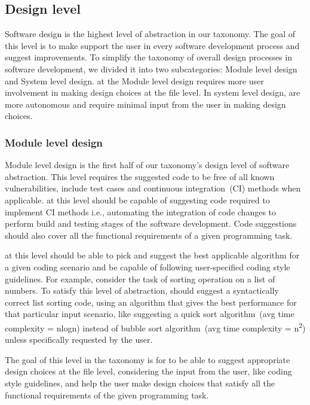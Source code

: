 \subsection{Design level}
Software design is the highest level of abstraction in our taxonomy. The goal of this level is to make \cct{} support the user in every software development process and suggest improvements.
To simplify the taxonomy of overall design processes in software development, we divided it into two subcategories: Module level design and System level design. 
\cct{} at the Module level design requires more user involvement in making design choices at the file level.
In system level design, \cct{} are more autonomous and require minimal input from the user in making design choices.

\subsubsection{Module level design}
\label{low_design}
Module level design is the first half of our taxonomy's design level of software abstraction.
This level requires the suggested code to be free of all known vulnerabilities, include test cases and continuous integration~(CI) methods when applicable. 
\cct{} at this level should be capable of suggesting code required to implement CI methods i.e., automating the integration of code changes to perform build and testing stages of the software development.
Code suggestions should also cover all the functional requirements of a given programming task.

\cct{} at this level should be able to pick and suggest the best applicable algorithm for a given coding scenario and be capable of following user-specified coding style guidelines.
For example, consider the task of sorting operation on a list of numbers. To satisfy this level of abstraction, \cct{} should suggest a syntactically correct list sorting code, using an algorithm that gives the best performance for that particular input scenario, like suggesting a quick sort algorithm~(avg time complexity = nlogn) instead of bubble sort algorithm~(avg time complexity = n\textsuperscript{2}) unless specifically requested by the user.

The goal of this level in the taxonomy is for \cct{} to be able to suggest appropriate design choices at the file level, considering the input from the user, like coding style guidelines, and help the user make design choices that satisfy all the functional requirements of the given programming task.

